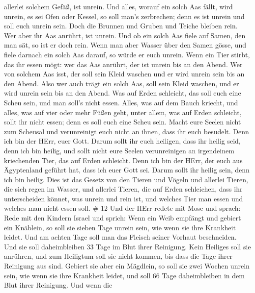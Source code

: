 allerlei solchem Gefäß, ist unrein.  Und alles, worauf ein
solch Aas fällt, wird unrein, es sei Ofen oder Kessel, so soll man's
zerbrechen; denn es ist unrein und soll euch unrein sein. 
Doch die Brunnen und Gruben und Teiche bleiben rein. Wer aber ihr Aas
anrührt, ist unrein.  Und ob ein solch Aas fiele auf Samen,
den man sät, so ist er doch rein.  Wenn man aber Wasser
über den Samen gösse, und fiele darnach ein solch Aas darauf, so würde
er euch unrein.  Wenn ein Tier stirbt, das ihr essen mögt:
wer das Aas anrührt, der ist unrein bis an den Abend.  Wer
von solchem Aas isst, der soll sein Kleid waschen und er wird unrein
sein bis an den Abend. Also wer auch trägt ein solch Aas, soll sein
Kleid waschen, und er wird unrein sein bis an den Abend. 
Was auf Erden schleicht, das soll euch eine Scheu sein, und man soll's
nicht essen.  Alles, was auf dem Bauch kriecht, und alles,
was auf vier oder mehr Füßen geht, unter allem, was auf Erden schleicht,
sollt ihr nicht essen; denn es soll euch eine Scheu sein. 
Macht eure Seelen nicht zum Scheusal und verunreinigt euch nicht an
ihnen, dass ihr euch besudelt.  Denn ich bin der HErr, euer
Gott. Darum sollt ihr euch heiligen, dass ihr heilig seid, denn ich bin
heilig, und sollt nicht eure Seelen verunreinigen an irgendeinem
kriechenden Tier, das auf Erden schleicht.  Denn ich bin
der HErr, der euch aus Ägyptenland geführt hat, dass ich euer Gott sei.
Darum sollt ihr heilig sein, denn ich bin heilig.  Dies ist
das Gesetz von den Tieren und Vögeln und allerlei Tieren, die sich regen
im Wasser, und allerlei Tieren, die auf Erden schleichen, 
dass ihr unterscheiden könnet, was unrein und rein ist, und welches Tier
man essen und welches man nicht essen soll. \# 12  Und der
HErr redete mit Mose und sprach:  Rede mit den Kindern
Israel und sprich: Wenn ein Weib empfängt und gebiert ein Knäblein, so
soll sie sieben Tage unrein sein, wie wenn sie ihre Krankheit leidet.
 Und am achten Tage soll man das Fleisch seiner Vorhaut
beschneiden.  Und sie soll daheimbleiben 33 Tage im Blut
ihrer Reinigung. Kein Heiliges soll sie anrühren, und zum Heiligtum soll
sie nicht kommen, bis dass die Tage ihrer Reinigung aus sind.
 Gebiert sie aber ein Mägdlein, so soll sie zwei Wochen
unrein sein, wie wenn sie ihre Krankheit leidet, und soll 66 Tage
daheimbleiben in dem Blut ihrer Reinigung.  Und wenn die
